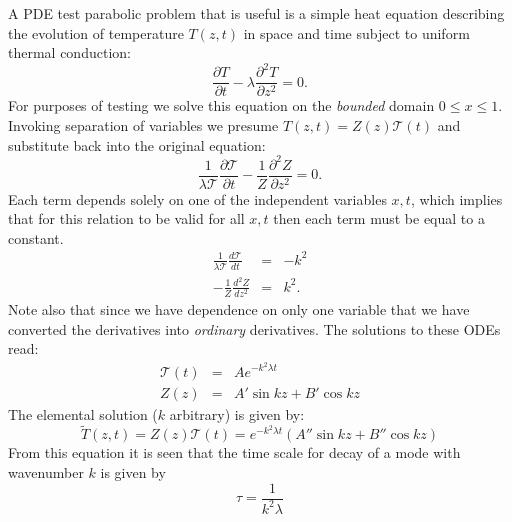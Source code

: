 \documentclass[11pt,letterpaper]{article}
\begin{document}
A PDE test parabolic problem that is useful is a simple heat equation describing the evolution of temperature $T(z,t)$ in space and time subject to uniform thermal conduction:
\begin{equation}
\frac{\partial T}{\partial t} - \lambda \frac{\partial^2 T}{\partial z^2} = 0.
\end{equation}
For purposes of testing we solve this equation on the \emph{bounded} domain $0 \le x \le 1$.  Invoking separation of variables we presume $T(z,t)=Z(z) \mathcal{T}(t)$ and substitute back into the original equation:  
\begin{equation}
\frac{1}{\lambda \mathcal{T}} \frac{\partial \mathcal{T}}{\partial t} - \frac{1}{Z} \frac{\partial^2 Z}{\partial z^2} = 0.
\end{equation}
Each term depends solely on one of the independent variables $x,t$, which implies that for this relation to be valid for all $x,t$ then each term must be equal to a constant.  
\begin{eqnarray}
\frac{1}{\lambda \mathcal{T}} \frac{d \mathcal{T}}{d t} &=& -k^2 \\
- \frac{1}{Z} \frac{d^2 Z}{d z^2} &=& k^2.
\end{eqnarray}
Note also that since we have dependence on only one variable that we have converted the derivatives into \emph{ordinary} derivatives.  The solutions to these ODEs read:
\begin{eqnarray}
\mathcal{T}(t) &=& A e^{-k^2 \lambda t} \\
Z(z) &=& A' \sin kz + B' \cos kz
\end{eqnarray}
The elemental solution ($k$ arbitrary) is given by: 
\begin{equation}
\tilde{T}(z,t)=Z(z) \mathcal{T}(t) = e^{-k^2 \lambda t} \left( A'' \sin kz + B'' \cos kz \right)
\end{equation}
From this equation it is seen that the time scale for decay of a mode with wavenumber $k$ is given by 
\begin{equation}
\tau = \frac{1}{k^2 \lambda}
\end{equation}
\end{document}
